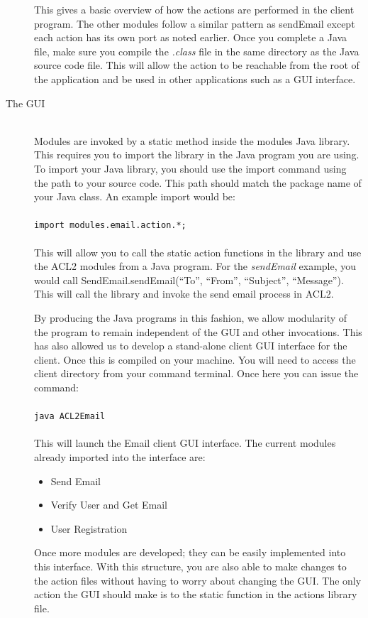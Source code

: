 \documentclass[11pt, letterpaper]{report}
\begin{document}
\begin{description}
This gives a basic overview of how the actions are performed in the client program. The other modules follow a similar pattern as sendEmail except each action has its own port as noted earlier. Once you complete a Java file, make sure you compile the \textit{.class} file in the same directory as the Java source code file. This will allow the action to be reachable from the root of the application and be used in other applications such as a GUI interface. \\
\item[The GUI]\hfill \\
Modules are invoked by a static method inside the modules Java library. This requires you to import the library in the Java program you are using. To import your Java library, you should use the import command using the path to your source code. This path should match the package name of your Java class. An example import would be:\\ \\
\verb$import modules.email.action.*;$\\\\
This will allow you to call the static action functions in the library and use the ACL2 modules from a Java program. For the \textit{sendEmail} example, you would call SendEmail.sendEmail(``To'', ``From'', ``Subject'', ``Message''). This will call the library and invoke the send email process in ACL2. 

By producing the Java programs in this fashion, we allow modularity of the program to remain independent of the GUI and other invocations. This has also allowed us to develop a stand-alone client GUI interface for the client. Once this is compiled on your machine. You will need to access the client directory from your command terminal. Once here you can issue the command:\\\\
\verb$java ACL2Email$\\\\
This will launch the Email client GUI interface. The current modules already imported into the interface are:
\begin{itemize}
\item Send Email
\item Verify User and Get Email
\item User Registration
\end{itemize}
Once more modules are developed; they can be easily implemented into this interface. With this structure, you are also able to make changes to the action files without having to worry about changing the GUI. The only action the GUI should make is to the static function in the actions library file. 




\end{description}
\end{document}
